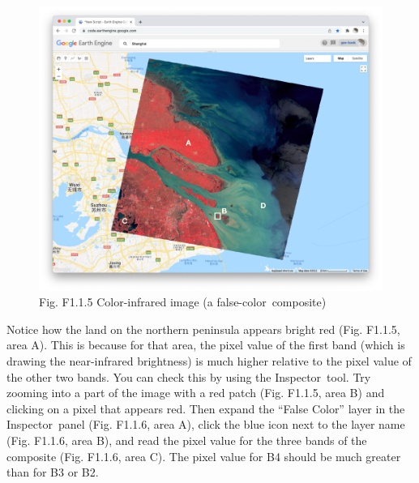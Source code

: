 \documentclass[
  letterpaper,
  DIV=11,
  numbers=noendperiod]{scrreprt}
\begin{document}
\begin{figure}

{\centering \includegraphics{./F1/image21.png}

}

\caption{Fig. F1.1.5 Color-infrared image (a false-color~composite)}

\end{figure}

Notice how the land on the northern peninsula appears bright red (Fig.
F1.1.5, area A). This is because for that area, the pixel value of the
first band (which is drawing the near-infrared brightness) is much
higher relative to the pixel value of the other two bands. You can check
this by using the Inspector~tool. Try zooming into a part of the image
with a red patch (Fig. F1.1.5, area B) and clicking on a pixel that
appears red. Then expand the ``False Color'' layer in the
Inspector~panel (Fig. F1.1.6, area A), click the blue icon next to the
layer name (Fig. F1.1.6, area B), and read the pixel value for the three
bands of the composite (Fig. F1.1.6, area C). The pixel value for B4
should be much greater than for B3 or B2.~
\end{document}
